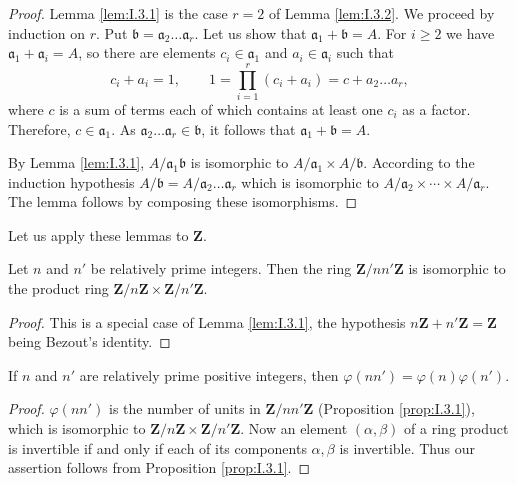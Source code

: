 \begin{proof}
Lemma \ref{lem:I.3.1} is the case $r=2$ of Lemma \ref{lem:I.3.2}. We
proceed by induction on $r$. Put
$\mathfrak{b}=\mathfrak{a}_{2}\ldots\mathfrak{a}_{r}$. Let us show that
$\mathfrak{a}_{1}+\mathfrak{b}=A$. For $i\geq2$ we have
$\mathfrak{a}_{1}+\mathfrak{a}_{i}=A$, so there are elements
$c_{i}\in\mathfrak{a}_{1}$ and $a_{i}\in\mathfrak{a}_{i}$ such that
\[
c_{i}+a_{i}=1,\qquad
1=\prod_{i=1}^{r}(c_{i}+a_{i})=c+a_{2}\ldots a_{r},
\]
where $c$ is a sum of terms each of which contains at least one $c_{i}$ as a
factor. Therefore, $c\in\mathfrak{a}_{1}$. As
$\mathfrak{a}_{2}\ldots\mathfrak{a}_{r}\in\mathfrak{b}$, it follows that
$\mathfrak{a}_{1}+\mathfrak{b}=A$.

By Lemma \ref{lem:I.3.1}, $A/\mathfrak{a}_{1}\mathfrak{b}$ is isomorphic to
$A/\mathfrak{a}_{1}\times A/\mathfrak{b}$. According to the induction
hypothesis $A/\mathfrak{b}=A/\mathfrak{a}_{2}\ldots\mathfrak{a}_{r}$ which
is isomorphic to $A/\mathfrak{a}_{2}\times\cdots\times A/\mathfrak{a}_{r}$.
The lemma follows by composing these isomorphisms.
\end{proof}

Let us apply these lemmas to $\mathbf{Z}$.

\begin{proposition}
\label{prop:I.3.2}
Let $n$ and $n'$ be relatively prime integers. Then the ring
$\mathbf{Z}/nn'\mathbf{Z}$ is isomorphic to the product ring
$\mathbf{Z}/n\mathbf{Z}\times\mathbf{Z}/n'\mathbf{Z}$.
\end{proposition}

\begin{proof}
This is a special case of Lemma \ref{lem:I.3.1}, the hypothesis
$n\mathbf{Z}+n'\mathbf{Z}=\mathbf{Z}$ being Bezout's identity.
\end{proof}

\begin{corollary}
\label{cor:I.3.1}
If $n$ and $n'$ are relatively prime positive integers, then
$\varphi(nn')=\varphi(n)\varphi(n')$.
\end{corollary}

\begin{proof}
$\varphi(nn')$ is the number of units in $\mathbf{Z}/nn'\mathbf{Z}$
(Proposition \ref{prop:I.3.1}), which is isomorphic to
$\mathbf{Z}/n\mathbf{Z}\times\mathbf{Z}/n'\mathbf{Z}$. Now an element
$(\alpha,\beta)$ of a ring product is invertible if and only if each of its
components $\alpha,\beta$ is invertible. Thus our assertion follows from
Proposition \ref{prop:I.3.1}.
\end{proof}

